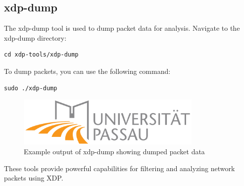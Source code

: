 \subsection{xdp-dump}
The xdp-dump tool is used to dump packet data for analysis. Navigate to the xdp-dump directory:
\begin{verbatim}
cd xdp-tools/xdp-dump
\end{verbatim}

To dump packets, you can use the following command:
\begin{verbatim}
sudo ./xdp-dump
\end{verbatim}

\begin{figure}[h]
\centering
\includegraphics[width=0.8\textwidth]{../images/uni-logo.png}
\caption{Example output of xdp-dump showing dumped packet data}
\label{fig:xdp-dump-example}
\end{figure}

These tools provide powerful capabilities for filtering and analyzing network packets using XDP.

